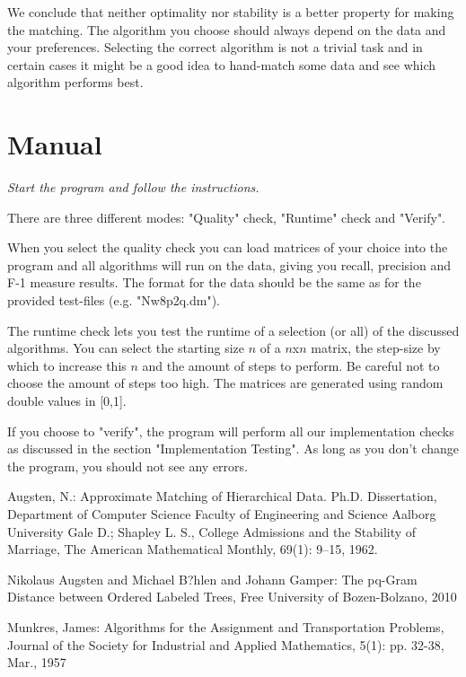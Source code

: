 \documentclass[a4paper,11pt]{article}
\begin{document}
We conclude that neither optimality nor stability is a better property for making the matching. The algorithm you choose should always depend on the data and your preferences. Selecting the correct algorithm is not a trivial task and in certain cases it might be a good idea to hand-match some data and see which algorithm performs best.

\section{Manual}

\textit{Start the program and follow the instructions.}

There are three different modes: "Quality" check, "Runtime" check and "Verify".

When you select the quality check you can load matrices of your choice into the program and all algorithms will run on the data, giving you recall, precision and F-1 measure results. The format for the data should be the same as for the provided test-files (e.g. "Nw8p2q.dm").

The runtime check lets you test the runtime of a selection (or all) of the discussed algorithms. You can select the starting size $n$ of a $n$x$n$ matrix, the step-size by which to increase this $n$ and the amount of steps to perform. Be careful not to choose the amount of steps too high. The matrices are generated using random double values in [0,1].

If you choose to "verify", the program will perform all our implementation checks as discussed in the section "Implementation Testing". As long as you don't change the program, you should not see any errors.


\begin{thebibliography}{9999}
Augsten, N.: Approximate Matching of Hierarchical Data. 
Ph.D. Dissertation, Department of Computer Science Faculty of Engineering and Science Aalborg University
Gale D.; Shapley L. S., College Admissions and the Stability of Marriage, The American Mathematical Monthly,  69(1): 9–15, 1962.

Nikolaus Augsten and Michael B?hlen and Johann Gamper: The pq-Gram Distance between Ordered Labeled Trees, Free University of Bozen-Bolzano, 2010 

Munkres, James: Algorithms for the Assignment and Transportation Problems, Journal of the Society for Industrial and Applied Mathematics, 5(1): pp. 32-38, Mar., 1957

\end{thebibliography}
\end{document}
